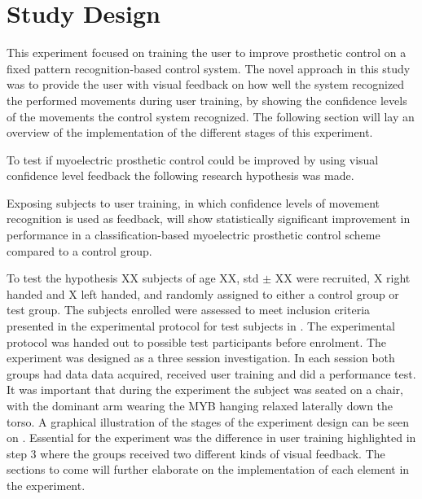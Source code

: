 \section{Study Design}

This experiment focused on training the user to improve prosthetic control on a fixed pattern recognition-based control system. The novel approach in this study was to provide the user with visual feedback on how well the system recognized the performed movements during user training, by showing the confidence levels of the movements the control system recognized. The following section will lay an overview of the implementation of the different stages of this experiment.

To test if myoelectric prosthetic control could be improved by using visual confidence level feedback the following research hypothesis was made.  
\begin{center}
	Exposing subjects to user training, in which confidence levels of movement recognition is used as feedback, will show statistically significant improvement in performance in a classification-based myoelectric prosthetic control scheme compared to a control group.
\end{center}


To test the hypothesis XX subjects of age XX, std $\pm$ XX were recruited, X right handed and X left handed, and randomly assigned to either a control group or test group. The subjects enrolled were assessed to meet inclusion criteria presented in the experimental protocol for test subjects in . The experimental protocol was handed out to possible test participants before enrolment. The experiment was designed as a three session investigation. In each session both groups had data data acquired, received user training and did a performance test. It was important that during the experiment the subject was seated on a chair, with the dominant arm wearing the MYB hanging relaxed laterally down the torso. A graphical illustration of the stages of the experiment design can be seen on . Essential for the experiment was the difference in user training highlighted in step 3 where the groups received two different kinds of visual feedback. The sections to come will further elaborate on the implementation of each element in the experiment.
 
